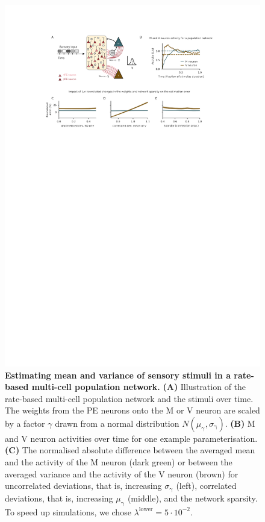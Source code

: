 \documentclass[10pt,a4paper]{article}
\begin{document}
\begin{figure}[!h]
	\centering
    \includegraphics{../results/figures/final/Fig_2_S2.pdf}%
\caption{\footnotesize{\bf Estimating mean and variance of sensory stimuli in a rate-based multi-cell population network.\newline}  
{\bf (A)} Illustration of the rate-based multi-cell population network and the stimuli over time. The weights from the PE neurons onto the M or V neuron are scaled by a factor $\gamma$ drawn from a normal distribution $N(\mu_\mathrm{\gamma}, \sigma_\mathrm{\gamma})$.
{\bf (B)} M and V neuron activities over time for one example parameterisation.
{\bf (C)} The normalised absolute difference between the averaged mean and the activity of the M neuron (dark green) or between the averaged variance and the activity of the V neuron (brown) for uncorrelated deviations, that is, increasing $\sigma_\mathrm{\gamma}$ (left), correlated deviations, that is, increasing $\mu_\mathrm{\gamma}$ (middle), and the network sparsity. To speed up simulations, we chose $\lambda^\mathrm{lower}=5\cdot 10^{-2}$.
}
\label{fig:Fig_2_S2}
\end{figure}
\end{document}
